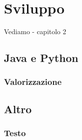 \chapter{Sviluppo}
Vediamo - capitolo 2

\section{Java e Python}

\subsection{Valorizzazione}

\section{Altro}

\subsection{Testo}

